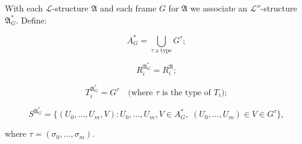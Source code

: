 With each $\mathcal{L}$-structure $\mathfrak{A}$ and each frame $G$ for $\mathfrak{A}$ we associate an $\mathcal{L}''$-structure $\mathfrak{A}_G^*$. Define:

$$A_G^* = \bigcup_{\tau \text{ a type}} G^\tau;$$

$$R_i^{\mathfrak{A}_G^*} = R_i^{\mathfrak{A}};$$

$$T_i^{\mathfrak{A}_G^*} = G^\tau \quad \text{(where } \tau \text{ is the type of } T_i\text{)};$$

$$S^{\mathfrak{A}_G^*} = \{(U_0, \ldots, U_m, V) : U_0, \ldots, U_m, V \in A_G^*, \; (U_0, \ldots, U_m) \in V \in G^\tau\},$$

where $\tau = (\sigma_0, \ldots, \sigma_m)$.
